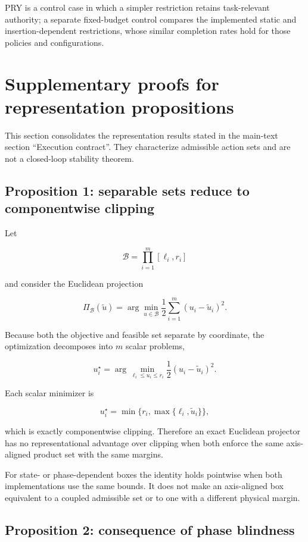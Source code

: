 \documentclass[10pt]{article}
\begin{document}
PRY is a control case in which a simpler restriction retains
task-relevant authority; a separate fixed-budget control compares the
implemented static and insertion-dependent restrictions, whose similar
completion rates hold for those policies and configurations.


\section{Supplementary proofs for representation propositions}

This section consolidates the representation results stated in the main-text section ``Execution contract''.
They characterize admissible action sets and are not a closed-loop stability
theorem.

\subsection*{Proposition 1: separable sets reduce to componentwise clipping}

Let

\[
\mathcal{B}
=
\prod_{i=1}^{m}[\ell_i,r_i]
\]

and consider the Euclidean projection

\[
\Pi_{\mathcal{B}}(\tilde u)
=
\arg\min_{u\in\mathcal{B}}
\frac{1}{2}\sum_{i=1}^{m}(u_i-\tilde u_i)^2 .
\]

Because both the objective and feasible set separate by coordinate, the
optimization decomposes into $m$ scalar problems,

\[
u_i^\star
=
\arg\min_{\ell_i\leq u_i\leq r_i}
\frac{1}{2}(u_i-\tilde u_i)^2 .
\]

Each scalar minimizer is

\[
u_i^\star
=
\min\{r_i,\max\{\ell_i,\tilde u_i\}\},
\]

which is exactly componentwise clipping. Therefore an exact Euclidean
projector has no representational advantage over clipping when both
enforce the same axis-aligned product set with the same margins.

For state- or phase-dependent boxes the identity holds pointwise when both
implementations use the same bounds. It does not make an axis-aligned box
equivalent to a coupled admissible set or to one with a different physical margin.


\subsection*{Proposition 2: consequence of phase blindness}
\end{document}
